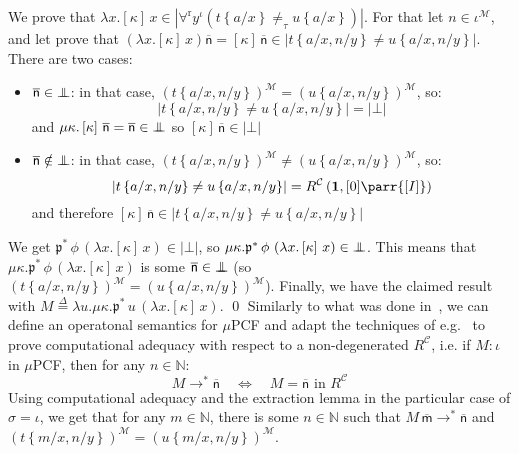 \documentclass{CSML}
\newcommand*\Def{\mathrel{\overset{\Delta}{=}}}
\newcommand*\SortA{\sigma}
\newcommand*\SortB{\tau}
\newcommand*\LogSortedTerm[2]{#1^{#2}}
\newcommand*\LogTermA{t}
\newcommand*\LogTermB{u}
\newcommand*\LogVarA{x}
\newcommand*\LogVarB{y}
\newcommand*\LogBot\bot
\newcommand*\LogForallRel{\forall^\mathrm{r}}
\newcommand*\LogProofA{\mathfrak{p}}
\newcommand*\LogSubst[1]{\left\{#1\right\}}
\newcommand*\ModM{\mathcal{M}}
\newcommand*\ModElemA{a}
\newcommand*\ModMInterp[1]{{#1}^\ModM}
\newcommand*\LmSortBot0
\newcommand*\LmTerm[2]{#1\mathrel{:}#2}
\newcommand*\LmTermA{M}
\newcommand*\LmVarA{x}
\newcommand*\LmVarD{u}
\newcommand*\LmConst[1]{\mathsf{#1}}
\newcommand*\LmInterpProof[1]{{#1}^*}
\newcommand*\CatC{\mathcal{C}}
\newcommand*\CatR{R}
\newcommand*\CatRC{\CatExp{\CatR}{\CatC}}
\newcommand*\CatExp[2]{#1^{#2}}
\newcommand*\CatPar\parr
\newcommand*\CatRCHomA\phi
\newcommand*\CatTerm{\mathbf{1}}
\newcommand*\CatInterpSort[1]{{\left[#1\right]}}
\newcommand*\RealVal[1]{\left|#1\right|}
\newcommand*\RealBot{{\bot\mkern-11mu\bot}}
\newcommand*\CASort\iota
\newcommand*\CALmn[1]{\LmConst{\overline{#1}}}
\newcommand*\CALmnSort{I}
\begin{document}
We prove that $\lambda\LmVarA.\left[\kappa\right]\,\LmVarA\in\RealVal{\LogForallRel\LogSortedTerm{\LogVarB}{\CASort}\left(\LogTermA\LogSubst{\ModElemA/\LogVarA}\neq_\SortB\LogTermB\LogSubst{\ModElemA/\LogVarA}\right)}$. For that let $n\in\ModMInterp{\CASort}$, and let prove that $\left(\lambda\LmVarA.\left[\kappa\right]\,\LmVarA\right)\CALmn{n}=\left[\kappa\right]\,\CALmn{n}\in\RealVal{\LogTermA\LogSubst{\ModElemA/\LogVarA,n/\LogVarB}\neq\LogTermB\LogSubst{\ModElemA/\LogVarA,n/\LogVarB}}$. There are two cases:
\begin{itemize}
\item$\CALmn{n}\in\RealBot$: in that case, $\ModMInterp{\left(\LogTermA\LogSubst{\ModElemA/\LogVarA,n/\LogVarB}\right)}=\ModMInterp{\left(\LogTermB\LogSubst{\ModElemA/\LogVarA,n/\LogVarB}\right)}$, so:
$$\RealVal{\LogTermA\LogSubst{\ModElemA/\LogVarA,n/\LogVarB}\neq\LogTermB\LogSubst{\ModElemA/\LogVarA,n/\LogVarB}}=\RealVal{\LogBot}$$
and $\mu\kappa.\left[\kappa\right]\,\CALmn{n}=\CALmn{n}\in\RealBot$ so $\left[\kappa\right]\,\CALmn{n}\in\RealVal{\LogBot}$
\item$\CALmn{n}\notin\RealBot$: in that case, $\ModMInterp{\left(\LogTermA\LogSubst{\ModElemA/\LogVarA,n/\LogVarB}\right)}\neq\ModMInterp{\left(\LogTermB\LogSubst{\ModElemA/\LogVarA,n/\LogVarB}\right)}$, so:
$$\RealVal{\LogTermA\LogSubst{\ModElemA/\LogVarA,n/\LogVarB}\neq\LogTermB\LogSubst{\ModElemA/\LogVarA,n/\LogVarB}}=\CatRC\left(\CatTerm,\CatInterpSort{\LmSortBot}\CatPar\CatInterpSort{\CALmnSort}\right)$$
and therefore $\left[\kappa\right]\,\CALmn{n}\in\RealVal{\LogTermA\LogSubst{\ModElemA/\LogVarA,n/\LogVarB}\neq\LogTermB\LogSubst{\ModElemA/\LogVarA,n/\LogVarB}}$
\end{itemize}
We get $\LmInterpProof{\LogProofA}\,\CatRCHomA\,\left(\lambda\LmVarA.\left[\kappa\right]\,\LmVarA\right)\in\RealVal{\LogBot}$, so $\mu\kappa.\LmInterpProof{\LogProofA}\,\CatRCHomA\,\left(\lambda\LmVarA.\left[\kappa\right]\,\LmVarA\right)\in\RealBot$. This means that $\mu\kappa.\LmInterpProof{\LogProofA}\,\CatRCHomA\,\left(\lambda\LmVarA.\left[\kappa\right]\,\LmVarA\right)$ is some $\CALmn{n}\in\RealBot$ (so $\ModMInterp{\left(\LogTermA\LogSubst{\ModElemA/\LogVarA,n/\LogVarB}\right)}=\ModMInterp{\left(\LogTermB\LogSubst{\ModElemA/\LogVarA,n/\LogVarB}\right)}$). Finally, we have the claimed result with $\LmTermA\Def\lambda\LmVarD.\mu\kappa.\LmInterpProof{\LogProofA}\,\LmVarD\,\left(\lambda\LmVarA.\left[\kappa\right]\,\LmVarA\right)$.
\qed
Similarly to what was done in~\cite{BlotRibaBarRec}, we can define an operatonal semantics for $\mu$PCF and adapt the techniques of e.g.~\cite{AmadioCurien} to prove computational adequacy with respect to a non-degenerated $\CatRC$, i.e. if $\LmTerm{\LmTermA}{\CASort}$ in $\mu$PCF, then for any $n\in\mathbb{N}$:
$$\LmTermA\rightarrow^*\CALmn{n}\quad\Longleftrightarrow\quad\LmTermA=\CALmn{n}\text{ in }\CatRC$$
Using computational adequacy and the extraction lemma in the particular case of $\SortA=\CASort$, we get that for any $m\in\mathbb{N}$, there is some $n\in\mathbb{N}$ such that $\LmTermA\,\CALmn{m}\rightarrow^*\CALmn{n}$ and $\ModMInterp{\left(\LogTermA\LogSubst{m/\LogVarA,n/\LogVarB}\right)}=\ModMInterp{\left(\LogTermB\LogSubst{m/\LogVarA,n/\LogVarB}\right)}$.
\end{document}
